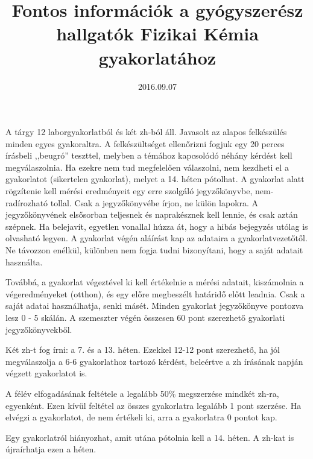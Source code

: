 \documentclass{article}
\begin{document}
\title{Fontos információk a  gyógyszerész hallgatók Fizikai Kémia gyakorlatához}
\date{2016.09.07}
\maketitle

A tárgy 12 laborgyakorlatból és két zh-ból áll. Javasolt az alapos felkészülés minden egyes gyakoraltra. A felkészültséget ellenőrizni fogjuk egy 20 perces írásbeli ,,beugró'' teszttel, melyben a témához kapcsolódó néhány kérdést kell megválaszolnia. Ha ezekre nem tud megfelelően válaszolni, nem kezdheti el a gyakorlatot (sikertelen gyakorlat), melyet a 14. héten pótolhat. A gyakorlat alatt rögzítenie kell mérési eredményeit egy erre szolgáló jegyzőkönyvbe, nem-radírozható tollal. Csak a jegyzőkönyvébe írjon, ne külön lapokra. A jegyzőkönyvének elsősorban teljesnek és naprakésznek kell lennie, és csak aztán szépnek. Ha belejavít, egyetlen vonallal húzza át, hogy a hibás bejegyzés utólag is olvasható legyen. A gyakorlat végén aláírást kap az adataira a gyakorlatvezetőtől. Ne távozzon enélkül, különben nem fogja tudni bizonyítani, hogy a saját adatait használta.

Továbbá, a gyakorlat végeztével ki kell értékelnie a mérési adatait, kiszámolnia a végeredményeket (otthon), és egy előre megbeszélt határidő előtt leadnia. Csak a saját adatai használhatja, senki másét. Minden gyakorlat jegyzőkönyve pontozva lesz 0 - 5 skálán. A szemeszter végén összesen 60 pont szerezhető gyakorlati jegyzőkönyvekből.

Két zh-t fog írni: a 7. és a 13. héten. Ezekkel 12-12 pont szerezhető, ha jól megválaszolja a 6-6 gyakorlathoz tartozó kérdést, beleértve a zh írásának napján végzett gyakorlatot is. 

A félév elfogadásának feltétele a legalább 50\% megszerzése mindkét zh-ra, egyenként. Ezen kívül feltétel az összes gyakorlatra legalább 1 pont szerzése. Ha elvégzi a gyakorlatot, de nem értékeli ki, arra a gyakorlatra 0 pontot kap.

Egy gyakorlatról hiányozhat, amit utána pótolnia kell a 14. héten. A zh-kat is újraírhatja ezen a héten.
\end{document}
